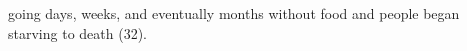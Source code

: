 \begin{Spacing}{1.5}
going days, weeks, and eventually months without food and people began starving to death (32).




\end{Spacing}
